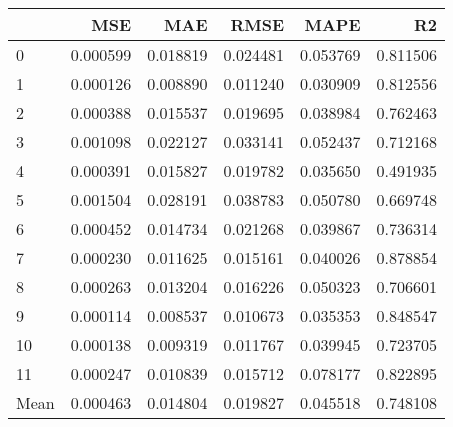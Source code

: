 \begin{tabular}{lrrrrr}
\toprule
 & MSE & MAE & RMSE & MAPE & R2 \\
\midrule
0 & 0.000599 & 0.018819 & 0.024481 & 0.053769 & 0.811506 \\
1 & 0.000126 & 0.008890 & 0.011240 & 0.030909 & 0.812556 \\
2 & 0.000388 & 0.015537 & 0.019695 & 0.038984 & 0.762463 \\
3 & 0.001098 & 0.022127 & 0.033141 & 0.052437 & 0.712168 \\
4 & 0.000391 & 0.015827 & 0.019782 & 0.035650 & 0.491935 \\
5 & 0.001504 & 0.028191 & 0.038783 & 0.050780 & 0.669748 \\
6 & 0.000452 & 0.014734 & 0.021268 & 0.039867 & 0.736314 \\
7 & 0.000230 & 0.011625 & 0.015161 & 0.040026 & 0.878854 \\
8 & 0.000263 & 0.013204 & 0.016226 & 0.050323 & 0.706601 \\
9 & 0.000114 & 0.008537 & 0.010673 & 0.035353 & 0.848547 \\
10 & 0.000138 & 0.009319 & 0.011767 & 0.039945 & 0.723705 \\
11 & 0.000247 & 0.010839 & 0.015712 & 0.078177 & 0.822895 \\
Mean & 0.000463 & 0.014804 & 0.019827 & 0.045518 & 0.748108 \\
\bottomrule
\end{tabular}
